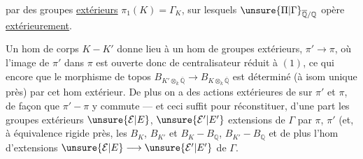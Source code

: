 par des groupes  \uline{extérieurs} $\pi_1(K)=\Gamma_K$, sur lesquels  $\unsure{\Pi|\Gamma}_{\overline{\mathbb Q}/\mathbb Q}$ opère \uline{extérieurement}.

Un hom de corps $K-K'$ donne lieu à un hom de groupes extérieurs,
 $\pi'\longrightarrow\pi$, où l'image de $\pi'$ dans $\pi$ est ouverte donc de centralisateur réduit à $(1)$, ce qui  encore que le morphisme de topos $B_{K'\otimes_k\overline{\mathbb Q}}\longrightarrow B_{K\otimes_k\overline{\mathbb Q}}$ est déterminé (à isom unique près) par cet hom extérieur. De plus on a des actions extérieures de  sur $\pi'$ et $\pi$, de façon que $\pi'-\pi$ y commute --- et ceci suffit pour réconstituer, d'une part les groupes extérieurs $\unsure{\mathcal E|E}$, $\unsure{\mathcal E'|E'}$ extensions  de $\Gamma$ par $\pi$, $\pi'$ (et, à équivalence rigide près, les $B_K$, $B_{K'}$ et $B_K-B_{\mathbb Q}$, $B_{K'}-B_{\mathbb Q}$ et de plus l'hom d'extensions  $\unsure{\mathcal E|E}\longrightarrow\unsure{\mathcal E'|E'}$ de $\Gamma$.

